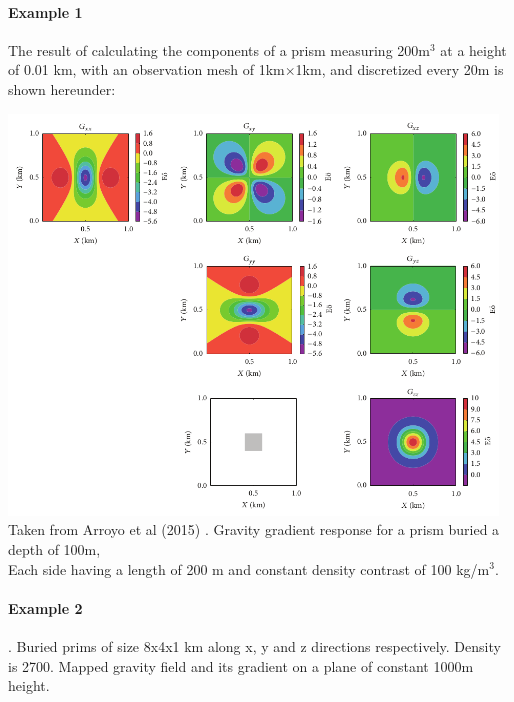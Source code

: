 \paragraph{Example 1}

The result of calculating
the components of a prism measuring 200m$^3$ at a height of 0.01 km, 
with an observation mesh of 1km$\times$1km, and discretized every 20m is shown hereunder:
\begin{center}
\includegraphics[width=13cm]{images/gravity/arct15b}\\
{\captionfont Taken from Arroyo et al (2015) \cite{arct15}. 
Gravity gradient response for a prism buried a depth of 100m,\\ 
Each side having a length of 200 m and constant density contrast 
of 100 kg/m$^3$.}
\end{center}


\newpage
\paragraph{Example 2}. Buried prims of size 8x4x1 km along x, y and z directions respectively. 
Density is 2700. Mapped gravity field and its gradient on a plane of constant 1000m height.

